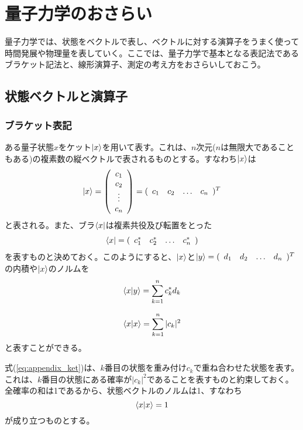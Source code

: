\appendix
\chapter{量子力学のおさらい}

量子力学では、状態をベクトルで表し、ベクトルに対する演算子をうまく使って時間発展や物理量を表していく。ここでは、量子力学で基本となる表記法であるブラケット記法と、線形演算子、測定の考え方をおさらいしておこう。

\section{状態ベクトルと演算子}
\subsection{ブラケット表記}
ある量子状態$x$をケット$\ket{x}$を用いて表す。これは、$n$次元($n$は無限大であることもある)の複素数の縦ベクトルで表されるものとする。すなわち$\ket x$は
\begin{equation}
	\ket{x} = \left( \begin{array}{c}
		c_1\\
		c_2\\
		\vdots\\
		c_n
	\end{array} \right) = (\begin{array}{cccc}
		c_1 & c_2 & \hdots & c_n
	\end{array}  )^T
	\label{eq:appendix_ket}
\end{equation}
と表される。また、ブラ$\bra{x}$は複素共役及び転置をとった
\begin{equation}
	\bra{x} = ( \begin{array}{cccc}
		c_1^* & c_2^* & \hdots & c_n^*
	\end{array})
\end{equation}
を表すものと決めておく。このようにすると、$\ket x$と$\ket y = (\begin{array}{cccc}
	d_1 & d_2 & \hdots & d_n
\end{array} )^T$の内積や$\ket x$のノルムを
\begin{equation}
	\braket{x|y} = \sum_{k=1}^n c_k^*d_k
\end{equation}

\begin{equation}
	\braket{x|x} = \sum_{k=1}^{n}{|c_k|^2}
\end{equation}
と表すことができる。

式(\ref{eq:appendix_ket})は、$k$番目の状態を重み付け$c_k$で重ね合わせた状態を表す。これは、$k$番目の状態にある確率が$|c_k|^2$であることを表すものと約束しておく。全確率の和は1であるから、状態ベクトルのノルムは1、すなわち
\begin{equation}
	\braket{x|x} = 1
\end{equation}
が成り立つものとする。



